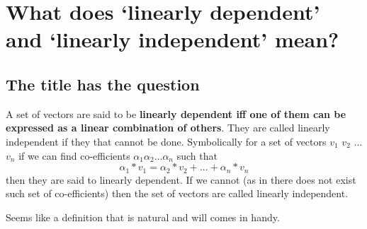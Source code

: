 \documentclass[../main.tex]{subfiles}
\begin{document}
\chapter{What does `linearly dependent' and `linearly independent' mean?}

\section{The title has the question}
A set of vectors are said to be \textbf{linearly dependent iff one of them can be expressed as a linear combination of others}. They are called linearly independent if they that cannot be done. Symbolically for a set of vectors $ v_1 $ $ v_2 $ ... $ v_n $ if we can find co-efficients $ \alpha_1 \alpha_2 ... \alpha_n $ such that \[ \alpha_1 * v_1  = \alpha_2 * v_2 + ... + \alpha_n * v_n \] then they are said to linearly dependent. If we cannot (as in there does not exist such set of co-efficients) then the set of vectors are called linearly independent.

Seems like a definition that is natural and will comes in handy.
\end{document}
